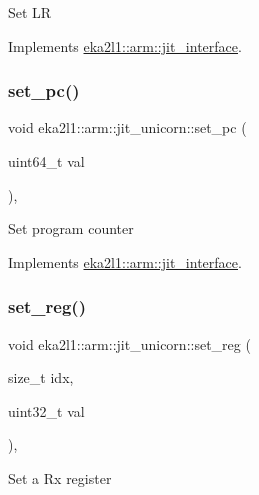 Set LR 

Implements \mbox{\hyperlink{classeka2l1_1_1arm_1_1jit__interface_a4e4da2ac6f5b627c0c7d9d3951edd053}{eka2l1\+::arm\+::jit\+\_\+interface}}.

\mbox{\label{classeka2l1_1_1arm_1_1jit__unicorn_ae5ea9a9c15af2aa73384e845679e1b7a}} 
\subsubsection{\texorpdfstring{set\+\_\+pc()}{set\_pc()}}
{\footnotesize\ttfamily void eka2l1\+::arm\+::jit\+\_\+unicorn\+::set\+\_\+pc (\begin{DoxyParamCaption}\item[{uint64\+\_\+t}]{val }\end{DoxyParamCaption})\hspace{0.3cm}{\ttfamily [override]}, {\ttfamily [virtual]}}

Set program counter 

Implements \mbox{\hyperlink{classeka2l1_1_1arm_1_1jit__interface_abda1155e6ce73a15e9ccf55a7c2465bb}{eka2l1\+::arm\+::jit\+\_\+interface}}.

\mbox{\label{classeka2l1_1_1arm_1_1jit__unicorn_ab56d9aa1489ec8d7a0c383f7d4048f03}} 
\subsubsection{\texorpdfstring{set\+\_\+reg()}{set\_reg()}}
{\footnotesize\ttfamily void eka2l1\+::arm\+::jit\+\_\+unicorn\+::set\+\_\+reg (\begin{DoxyParamCaption}\item[{size\+\_\+t}]{idx,  }\item[{uint32\+\_\+t}]{val }\end{DoxyParamCaption})\hspace{0.3cm}{\ttfamily [override]}, {\ttfamily [virtual]}}

Set a Rx register 


